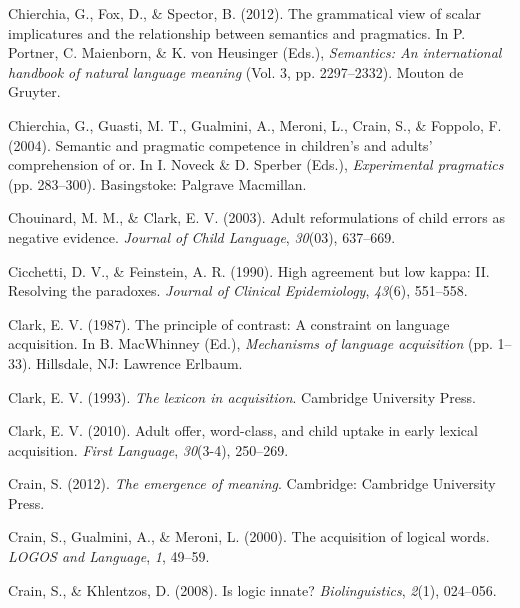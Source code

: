\documentclass[
  ,man,floatsintext]{apa6}
\newlength{\cslhangindent}
\newlength{\cslentryspacingunit} %
\newenvironment{CSLReferences}[2] %
 {%
  \setlength{\parindent}{0pt}
  \ifodd #1
  \let\oldpar\par
  \def\par{\hangindent=\cslhangindent\oldpar}
  \fi
  \setlength{\parskip}{#2\cslentryspacingunit}
 }%
 {}
\begin{document}
\begin{CSLReferences}{1}{0}
\leavevmode{}%
Chierchia, G., Fox, D., \& Spector, B. (2012). The grammatical view of scalar implicatures and the relationship between semantics and pragmatics. In P. Portner, C. Maienborn, \& K. von Heusinger (Eds.), \emph{Semantics: An international handbook of natural language meaning} (Vol. 3, pp. 2297--2332). Mouton de Gruyter.

\leavevmode{}%
Chierchia, G., Guasti, M. T., Gualmini, A., Meroni, L., Crain, S., \& Foppolo, F. (2004). Semantic and pragmatic competence in children's and adults' comprehension of or. In I. Noveck \& D. Sperber (Eds.), \emph{Experimental pragmatics} (pp. 283--300). Basingstoke: Palgrave Macmillan.

\leavevmode{}%
Chouinard, M. M., \& Clark, E. V. (2003). Adult reformulations of child errors as negative evidence. \emph{Journal of Child Language}, \emph{30}(03), 637--669.

\leavevmode{}%
Cicchetti, D. V., \& Feinstein, A. R. (1990). High agreement but low kappa: II. Resolving the paradoxes. \emph{Journal of Clinical Epidemiology}, \emph{43}(6), 551--558.

\leavevmode{}%
Clark, E. V. (1987). The principle of contrast: A constraint on language acquisition. In B. MacWhinney (Ed.), \emph{Mechanisms of language acquisition} (pp. 1--33). Hillsdale, NJ: Lawrence Erlbaum.

\leavevmode{}%
Clark, E. V. (1993). \emph{The lexicon in acquisition}. Cambridge University Press.

\leavevmode{}%
Clark, E. V. (2010). Adult offer, word-class, and child uptake in early lexical acquisition. \emph{First Language}, \emph{30}(3-4), 250--269.

\leavevmode{}%
Crain, S. (2012). \emph{The emergence of meaning}. Cambridge: Cambridge University Press.

\leavevmode{}%
Crain, S., Gualmini, A., \& Meroni, L. (2000). The acquisition of logical words. \emph{LOGOS and Language}, \emph{1}, 49--59.

\leavevmode{}%
Crain, S., \& Khlentzos, D. (2008). Is logic innate? \emph{Biolinguistics}, \emph{2}(1), 024--056.


\end{CSLReferences}
\end{document}
